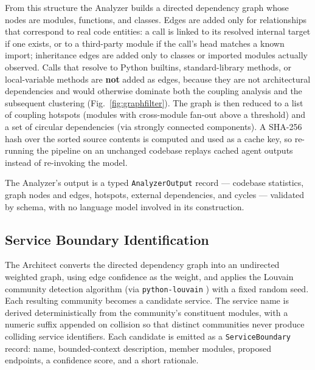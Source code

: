 \documentclass[conference]{IEEEtran}
\begin{document}
From this structure the Analyzer builds a directed dependency graph whose nodes are modules, functions, and classes. Edges are added only for relationships that correspond to real code entities: a call is linked to its resolved internal target if one exists, or to a third-party module if the call's head matches a known import; inheritance edges are added only to classes or imported modules actually observed. Calls that resolve to Python builtins, standard-library methods, or local-variable methods are \textbf{not} added as edges, because they are not architectural dependencies and would otherwise dominate both the coupling analysis and the subsequent clustering (Fig.~\ref{fig:graphfilter}). The graph is then reduced to a list of coupling hotspots (modules with cross-module fan-out above a threshold) and a set of circular dependencies (via strongly connected components). A SHA-256 hash over the sorted source contents is computed and used as a cache key, so re-running the pipeline on an unchanged codebase replays cached agent outputs instead of re-invoking the model.

The Analyzer's output is a typed \texttt{AnalyzerOutput} record --- codebase statistics, graph nodes and edges, hotspots, external dependencies, and cycles --- validated by schema, with no language model involved in its construction.

\subsection{Service Boundary Identification}

The Architect converts the directed dependency graph into an undirected weighted graph, using edge confidence as the weight, and applies the Louvain community detection algorithm \cite{blondel2008} (via \texttt{python-louvain} \cite{aynaud2020}) with a fixed random seed. Each resulting community becomes a candidate service. The service name is derived deterministically from the community's constituent modules, with a numeric suffix appended on collision so that distinct communities never produce colliding service identifiers. Each candidate is emitted as a \texttt{ServiceBoundary} record: name, bounded-context description, member modules, proposed endpoints, a confidence score, and a short rationale.
\end{document}
